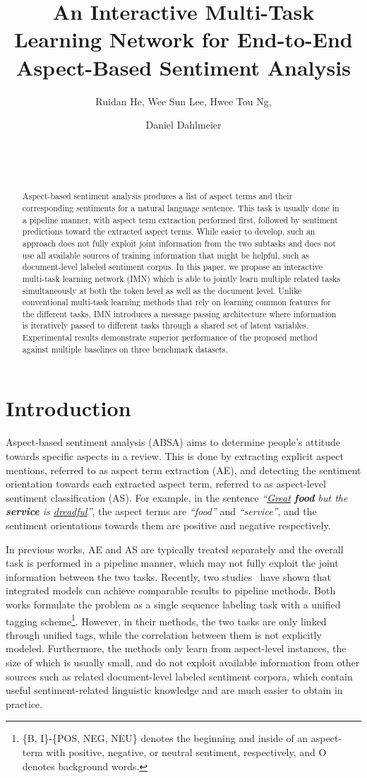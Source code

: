 \documentclass[11pt,a4paper]{article}
\title{An Interactive Multi-Task Learning Network for End-to-End Aspect-Based Sentiment Analysis}
\author{Ruidan He\affmark[\dag\ddag], Wee Sun Lee\affmark[\dag], Hwee Tou Ng\affmark[\dag], \and Daniel Dahlmeier\affmark[\ddag]\\
\affaddr{\affmark[\dag]Department of Computer Science, National University of Singapore}\\
\affaddr{\affmark[\ddag]SAP Innovation Center Singapore}\\
\email{\affmark[\dag]\{ruidanhe,leews,nght\}@comp.nus.edu.sg}\\
\email{\affmark[\ddag]d.dahlmeier@sap.com}}
\date{}
\begin{document}
\maketitle
\begin{abstract}
Aspect-based sentiment analysis produces a list of aspect terms and their corresponding sentiments for a natural language sentence. This task is usually done in a pipeline manner, with aspect term extraction performed first, followed by sentiment predictions toward the extracted aspect terms. While easier to develop, such an approach does not fully exploit joint information from the two subtasks and does not use all available sources of training information that might be helpful, such as document-level labeled sentiment corpus. In this paper, we propose an interactive multi-task learning network (IMN) which is able to jointly learn multiple related tasks simultaneously at both the token level as well as the document level. Unlike conventional multi-task learning methods that rely on learning common features for the different tasks, IMN introduces a message passing architecture where information is iteratively passed to different tasks through a shared set of latent variables. Experimental results demonstrate superior performance of the proposed method against multiple baselines on three benchmark datasets. 
\end{abstract}


\section{Introduction}
Aspect-based sentiment analysis (ABSA) aims to determine people's attitude towards specific aspects in a review. This is done by extracting explicit aspect mentions, referred to as aspect term extraction (AE), and detecting the sentiment orientation towards each extracted aspect term, referred to as aspect-level sentiment classification (AS). For example, in the sentence \emph{``\underline{Great} \textbf{food} but the \textbf{service} is \underline{dreadful}''}, the aspect terms are \emph{``food''} and \emph{``service''}, and the sentiment orientations towards them are positive and negative respectively.  


In previous works, AE and AS are typically treated separately and the overall task is performed in a pipeline manner, which may not fully exploit the joint information between the two tasks. Recently, two studies~\citep{Wang:18b, Li:19} have shown that integrated models can achieve comparable results to pipeline methods. Both works formulate the problem as a single sequence labeling task with a unified tagging scheme\footnote{\{B, I\}-\{POS, NEG, NEU\} denotes the beginning and inside of an aspect-term with positive, negative, or neutral sentiment, respectively, and O denotes background words.}.
However, in their methods, the two tasks are only linked through unified tags, while the correlation between them is not explicitly modeled. Furthermore, the methods only learn from aspect-level instances, the size of which is usually small, and do not exploit available information from other sources such as related document-level labeled sentiment corpora, which contain useful sentiment-related linguistic knowledge and are much easier to obtain in practice.
\end{document}
